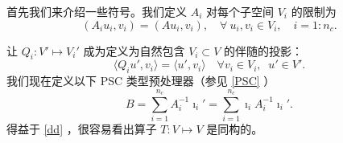 \documentclass[12pt]{acta_2011xz}
\begin{document}
首先我们来介绍一些符号。我们定义    $A_i$    对每个子空间    $V_i$    的限制为
   \begin{equation}\label{defAi}
(A_iu_i,v_i)=(A u_i,v_i), \quad \forall  \  u_i,v_i\in V_i,  \quad i=1:n_c.
\end{equation}     

让    $Q_i: V'\mapsto V_i'$    成为定义为自然包含    $V_i\subset V$    的伴随的投影：
   $$
\langle Q_i u', v_i\rangle = \langle u', v_i\rangle \quad \forall v_i\in V_i, \;\; u'\in V'.
$$    我们现在定义以下 PSC 类型预处理器（参见    \eqref{PSC}    ）
   \begin{equation}\label{T}
    B=\sum_{i=1}^{n_c}A_i^{-1}\imath_i'=
    \sum_{i=1}^{n_c}\imath_iA_i^{-1}\imath_i'.   
\end{equation}    得益于    \eqref{dd}    ，很容易看出算子    $T:V\mapsto
V$    是同构的。  
\end{document}
